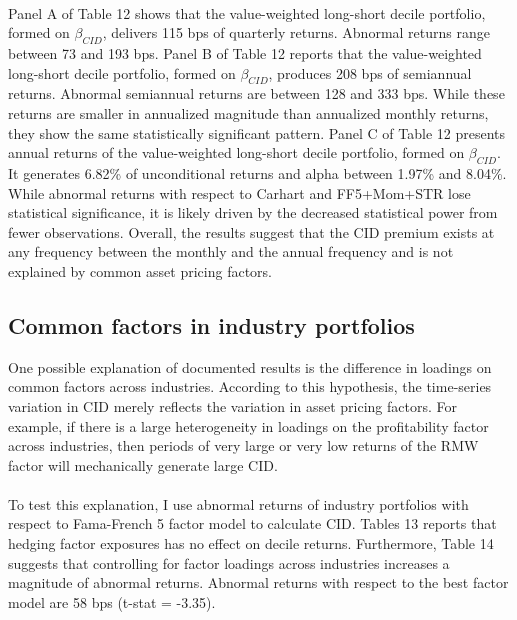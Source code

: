 \documentclass[12pt]{article}
\begin{document}
\paragraph{}
Panel A of Table 12 shows that the value-weighted long-short decile portfolio, formed on $\beta_{CID}$, delivers 115 bps of quarterly returns. Abnormal returns range between 73 and 193 bps. Panel B of Table 12 reports that the value-weighted long-short decile portfolio, formed on $\beta_{CID}$, produces 208 bps of semiannual returns. Abnormal semiannual returns are between 128 and 333 bps. While these returns are smaller in annualized magnitude than annualized monthly returns, they show the same statistically significant pattern. Panel C of Table 12 presents annual returns of the value-weighted long-short decile portfolio, formed on $\beta_{CID}$. It generates 6.82\% of unconditional returns and alpha between 1.97\% and 8.04\%. While abnormal returns with respect to Carhart and FF5+Mom+STR lose statistical significance, it is likely driven by the decreased statistical power from fewer observations. Overall, the results suggest that the CID premium exists at any frequency between the monthly and the annual frequency and is not explained by common asset pricing factors.

\subsection{Common factors in industry portfolios}

One possible explanation of documented results is the difference in loadings on common factors across industries. According to this hypothesis, the time-series variation in CID merely reflects the variation in asset pricing factors. For example, if there is a large heterogeneity in loadings on the profitability factor across industries, then periods of very large or very low returns of the RMW factor will mechanically generate large CID.
\paragraph{}
To test this explanation, I use abnormal returns of industry portfolios with respect to Fama-French 5 factor model to calculate CID. Tables 13 reports that hedging factor exposures has no effect on decile returns. Furthermore, Table 14 suggests that controlling for factor loadings across industries increases a magnitude of abnormal returns. Abnormal returns with respect to the best factor model are 58 bps (t-stat = -3.35). 
\end{document}
